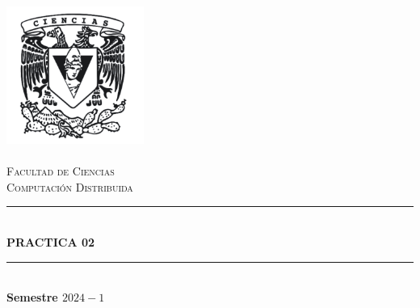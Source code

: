 \begin{titlepage}
    \center%
    \newcommand{\HRule}{\rule{\linewidth}{0.5mm}} 
    
    \includegraphics[width=4.5cm]{IMA/Ciencias.png} \\ 
    
    \quad \\[1.5cm]
    \textsc{\Large Facultad de Ciencias}\\[0.5cm] %
    \textsc{\Large Computación Distribuida}\\[0.5cm] %
    \makeatletter
        \HRule\\ [0.4cm]
            { \huge \bfseries PRACTICA 02}\\
        \HRule\\ [0.4cm]
    \large\textbf{Semestre $2024-1$}\\
    

\end{titlepage}
